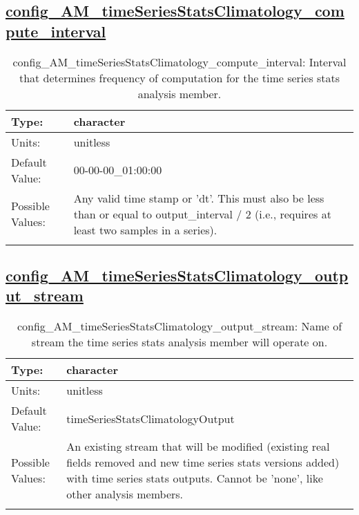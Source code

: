\subsection[config\_AM\_timeSeriesStatsClimatology\_compute\_interval]{\hyperref[sec:nm_tab_AM_timeSeriesStatsClimatology]{config\_AM\_timeSeriesStatsClimatology\_compute\_interval}}
\label{subsec:nm_sec_config_AM_timeSeriesStatsClimatology_compute_interval}
\begin{center}
\begin{longtable}{| p{2.0in} || p{4.0in} |}
    \hline
    Type: & character \\
    \hline
    Units: & \si{unitless} \\
    \hline
    Default Value: & 00-00-00\_01:00:00 \\
    \hline
    Possible Values: & Any valid time stamp or 'dt'. This must also be less than or equal to output\_interval / 2 (i.e., requires at least two samples in a series). \\
    \hline
    \caption{config\_AM\_timeSeriesStatsClimatology\_compute\_interval: Interval that determines frequency of computation for the time series stats analysis member.}
\end{longtable}
\end{center}
\subsection[config\_AM\_timeSeriesStatsClimatology\_output\_stream]{\hyperref[sec:nm_tab_AM_timeSeriesStatsClimatology]{config\_AM\_timeSeriesStatsClimatology\_output\_stream}}
\label{subsec:nm_sec_config_AM_timeSeriesStatsClimatology_output_stream}
\begin{center}
\begin{longtable}{| p{2.0in} || p{4.0in} |}
    \hline
    Type: & character \\
    \hline
    Units: & \si{unitless} \\
    \hline
    Default Value: & timeSeriesStatsClimatologyOutput \\
    \hline
    Possible Values: & An existing stream that will be modified (existing real fields removed and new time series stats versions added) with time series stats outputs. Cannot be 'none', like other analysis members. \\
    \hline
    \caption{config\_AM\_timeSeriesStatsClimatology\_output\_stream: Name of stream the time series stats analysis member will operate on.}
\end{longtable}
\end{center}

